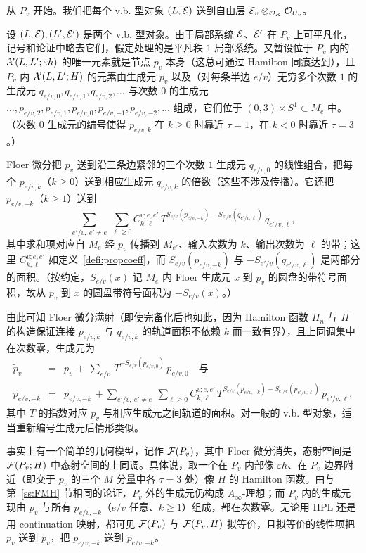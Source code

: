 从 $P_v$ 开始。我们把每个 v.b. 型对象 $(L,\mathcal{E})$ 送到自由层 $\mathcal{E}_{v}\otimes_{\mathcal{O}_K}\mathcal{O}_{U_v}$。

设 $(L,\mathcal{E}),(L',\mathcal{E}')$ 是两个 v.b. 型对象。由于局部系统 $\mathcal{E}$、$\mathcal{E}'$ 在 $P_v$ 上可平凡化，记号和论证中略去它们，假定处理的是平凡秩 $1$ 局部系统。又暂设位于 $P_v$ 内的 $\mathcal{X}(L,L';\varepsilon h)$ 的唯一元素就是节点 $p_v$ 本身（这总可通过 Hamilton 同痕达到），且 $P_v$ 内 $\mathcal{X}(L,L';H)$ 的元素由生成元 $p_v$ 以及（对每条半边 $e/v$）无穷多个次数 $1$ 的生成元 $q_{e/v,0},q_{e/v,1},q_{e/v,2},\dots$ 与次数 $0$ 的生成元 $\dots,p_{e/v,2},p_{e/v,1},p_{e/v,0},p_{e/v,-1},p_{e/v,-2},\dots$ 组成，它们位于 $(0,3)\times S^1\subset M_e$ 中。（次数 $0$ 生成元的编号使得 $p_{e/v,k}$ 在 $k\geq 0$ 时靠近 $\tau=1$，在 $k<0$ 时靠近 $\tau=3$。）

Floer 微分把 $p_v$ 送到沿三条边紧邻的三个次数 $1$ 生成元 $q_{e/v,0}$ 的线性组合，把每个 $p_{e/v,k}$（$k\geq 0$）送到相应生成元 $q_{e/v,k}$ 的倍数（这些不涉及传播）。它还把 $p_{e/v,-k}$（$k\geq 1$）送到
\[
\sum_{e'/v,\ e'\neq e}\ \sum_{\ell\geq 0} C^{v;e,e'}_{k,\ell}\,
T^{S_{e/v}(p_{e/v,-k})-S_{e'/v}(q_{e'/v,\ell})}\,q_{e'/v,\ell},
\]
其中求和项对应自 $M_e$ 经 $p_v$ 传播到 $M_{e'}$、输入次数为 $k$、输出次数为 $\ell$ 的带；这里 $C^{v;e,e'}_{k,\ell}$ 如定义~\ref{defi:propcoeff}，而 $S_{e/v}(p_{e/v,-k})$ 与 $-S_{e'/v}(q_{e'/v,\ell})$ 是两部分的面积。（按约定，$S_{e/v}(x)$ 记 $M_e$ 内 Floer 生成元 $x$ 到 $p_v$ 的圆盘的带符号面积，故从 $p_v$ 到 $x$ 的圆盘带符号面积为 $-S_{e/v}(x)$。）

由此可知 Floer 微分满射（即使完备化后也如此，因为 Hamilton 函数 $H_n$ 与 $H$ 的构造保证连接 $p_{e/v,k}$ 与 $q_{e/v,k}$ 的轨道面积不依赖 $k$ 而一致有界），且上同调集中在次数零，生成元为
\begin{eqnarray}\label{eq:tildepv}
\tilde{p}_v&=&p_v\,+\,\sum_{e/v}\,
T^{-S_{e/v}(p_{e/v,0})}\,p_{e/v,0}\quad \text{与}\\
\label{eq:tildepev}
\tilde{p}_{e/v,-k}&=&p_{e/v,-k}\,+\sum_{e'/v,\ e'\neq e}\ \sum_{\ell\geq 0} C^{v;e,e'}_{k,\ell}\,
T^{S_{e/v}(p_{e/v,-k})-S_{e'/v}(p_{e'/v,\ell})}\,p_{e'/v,\ell},
\end{eqnarray}
其中 $T$ 的指数对应 $p_v$ 与相应生成元之间轨道的面积。对一般的 v.b. 型对象，适当重新编号生成元后情形类似。

事实上有一个简单的几何模型，记作 $\mathcal{F}(P_v)$，其中 Floer 微分消失，态射空间是 $\mathcal{F}(P_v;H)$ 中态射空间的上同调。具体说，取一个在 $P_v$ 内部像 $\varepsilon h$、在 $P_v$ 边界附近（即交于 $p_v$ 的三个 $M$ 分量中各 $\tau=3$ 处）像 $H$ 的 Hamilton 函数。由与第~\ref{ss:FMH} 节相同的论证，$P_v$ 外的生成元仍构成 $A_\infty$-理想；而 $P_v$ 内的生成元现由 $p_v$ 与所有 $p_{e/v,-k}$（$e/v$ 任意、$k\geq 1$）组成，都在次数零。无论用 HPL 还是用 continuation 映射，都可见 $\mathcal{F}(P_v)$ 与 $\mathcal{F}(P_v;H)$ 拟等价，且拟等价的线性项把 $p_v$ 送到 $\tilde{p}_v$，把 $p_{e/v,-k}$ 送到 $\tilde{p}_{e/v,-k}$。

